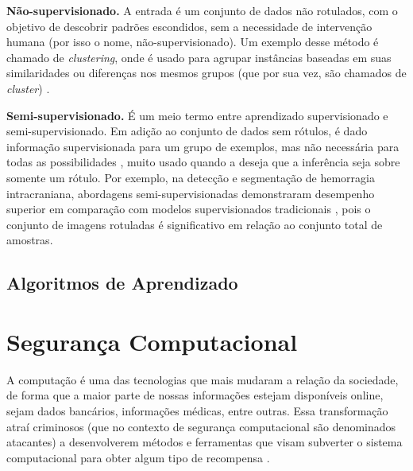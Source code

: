 
\textbf{Não-supervisionado.} A entrada é um conjunto de dados não rotulados, com o objetivo de descobrir padrões escondidos, sem a necessidade de intervenção humana (por isso o nome, não-supervisionado). Um exemplo desse método é chamado de \textit{clustering}, onde é usado para agrupar instâncias baseadas em suas similaridades ou diferenças nos mesmos grupos (que por sua vez, são chamados de \textit{cluster}) \cite{Pitafi2023}.

\textbf{Semi-supervisionado.} É um meio termo entre aprendizado supervisionado e semi-supervisionado. Em adição ao conjunto de dados sem rótulos, é dado informação supervisionada para um grupo de exemplos, mas não necessária para todas as possibilidades \cite{Chapelle2009}, muito usado quando a deseja que a inferência seja sobre somente um rótulo. Por exemplo, na detecção e segmentação de hemorragia intracraniana, abordagens semi-supervisionadas demonstraram desempenho superior em comparação com modelos supervisionados tradicionais \cite{Lin2024}, pois o conjunto de imagens rotuladas é significativo em relação ao conjunto total de amostras.

    
\subsection{Algoritmos de Aprendizado}
\label{ml:alg}

\section{Segurança Computacional}
\label{sec}
A computação é uma das tecnologias que mais mudaram a relação da sociedade, de forma que a maior parte de nossas informações estejam disponíveis online, sejam dados bancários, informações médicas, entre outras. Essa transformação atraí criminosos (que no contexto de segurança computacional são denominados atacantes) a desenvolverem métodos e ferramentas que visam subverter o sistema computacional para obter algum tipo de recompensa \citep{anderson2020security}.

